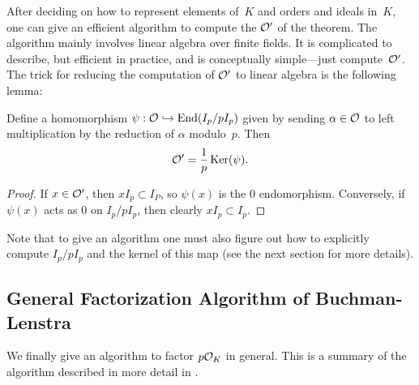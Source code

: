 After deciding on how to represent elements of~$K$ and orders and
ideals in~$K$, one can give an efficient algorithm to compute the
$\mathcal{O}'$ of the theorem.  The algorithm mainly involves linear algebra
over finite fields.  It is complicated to describe, but efficient in
practice, and is conceptually simple---just compute~$\mathcal{O}'$.  The trick
for reducing the computation of $\mathcal{O}'$ to linear algebra is the
following lemma:
\begin{lemma}
  Define a homomorphism $\psi:\mathcal{O} \hookrightarrow \operatorname{End}(I_p/ p I_p)$ given by
  sending $\alpha\in\mathcal{O}$ to left multiplication by the reduction of
  $\alpha$ modulo~$p$.  Then
$$ 
   \mathcal{O}'=\frac{1}{p} \operatorname{Ker}(\psi).
$$
\end{lemma}
\begin{proof}
If $x \in \mathcal{O}'$, then $x I_p \subset I_P$, so $\psi(x)$ is the $0$ 
endomorphism.  Conversely, if $\psi(x)$ acts as $0$ on $I_p/ p I_p$,
then clearly $x I_p \subset I_p$.
\end{proof}

Note that to give an algorithm one must also figure out how to
explicitly compute $I_p/ p I_p$ and the kernel of this map 
(see  the next section for more
details).


\subsection{General Factorization Algorithm of Buchman-Lenstra}
We finally give an algorithm to factor $p\mathcal{O}_K$ in general. This is a
summary of the algorithm described in more detail in 
\cite[\S6.2]{cohen:course_ant}.


